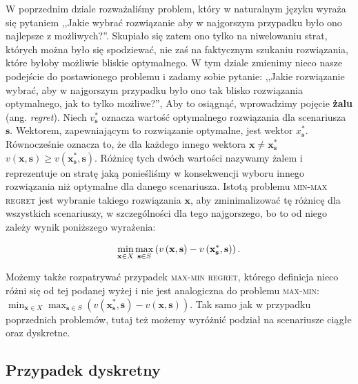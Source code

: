 W poprzednim dziale rozważaliśmy problem, który w naturalnym języku wyraża się pytaniem ,,Jakie wybrać rozwiązanie aby w najgorszym przypadku było ono najlepsze z możliwych?''. Skupiało się zatem ono tylko na niwelowaniu strat, których można było się spodziewać, nie zaś na faktycznym szukaniu rozwiązania, które byłoby możliwie bliskie optymalnego. W tym dziale zmienimy nieco nasze podejście do postawionego problemu i zadamy sobie pytanie: ,,Jakie rozwiązanie wybrać, aby w najgorszym przypadku było ono tak blisko rozwiązania optymalnego, jak to tylko możliwe?'', Aby to osiągnąć, wprowadzimy pojęcie \textbf{żalu} (ang. \textit{regret}). Niech $v_{\textbf{s}}^{\ast}$ oznacza wartość optymalnego rozwiązania dla scenariusza $\textbf{s}$. Wektorem, zapewniającym to rozwiązanie optymalne, jest wektor $x^{\ast}_{\textbf{s}}$. Równocześnie oznacza to, że dla każdego innego wektora $\textbf{x} \neq \textbf{x}^{\ast}_{\textbf{s}}$ $v \left( \textbf{x}, \textbf{s} \right) \geqslant v \left( \textbf{x}^{\ast}_{\textbf{s}}, \textbf{s} \right)$. Różnicę tych dwóch wartości nazywamy żalem i reprezentuje on stratę jaką ponieśliśmy w konsekwencji wyboru innego rozwiązania niż optymalne dla danego scenariusza. Istotą problemu \textsc{min-max regret} jest wybranie takiego rozwiązania $\textbf{x}$, aby zminimalizować tę różnicę dla wszystkich scenariuszy, w szczególności dla tego najgorszego, bo to od niego zależy wynik poniższego wyrażenia:

\begin{equation}
	\min_{\mathclap{\textbf{x} \in X}} \max_{\mathclap{\textbf{s} \in S}} \left( v \left( \textbf{x}, \textbf{s} \right) - v \left( \textbf{x}^{\ast}_{\textbf{s}}, \textbf{s} \right) \right)\text{.}
\end{equation}

Możemy także rozpatrywać przypadek \textsc{max-min regret}, którego definicja nieco różni się od tej podanej wyżej i nie jest analogiczna do problemu \textsc{max-min}: $\min_{\textbf{x} \in X} \max_{\textbf{s} \in S} \left( v \left( \textbf{x}^{\ast}_{\textbf{s}}, \textbf{s} \right) - v \left( \textbf{x}, \textbf{s} \right) \right)$. Tak samo jak w przypadku poprzednich problemów, tutaj też możemy wyróżnić podział na scenariusze ciągłe oraz dyskretne.

\subsection{Przypadek dyskretny}

